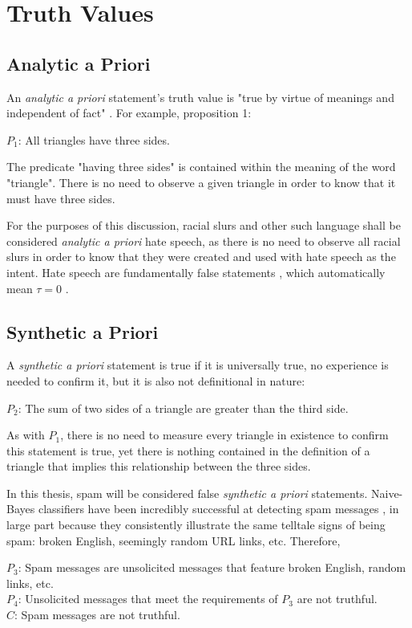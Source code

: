\documentclass[12pt]{article}
\begin{document}
\appendix
\section{Truth Values}
\label{truthvalue appendix}
\subsection{Analytic a Priori}
An \textit{analytic a priori} statement's truth value is "true by virtue of meanings and independent of fact" \cite{quine1951main}. 
For example, proposition 1: \begin{center}
    $P_1$: All triangles have three sides.
\end{center}
The predicate "having three sides" is contained within the meaning of the word "triangle". There is no need to observe a given triangle in order to know that it must have three sides.

For the purposes of this discussion, racial slurs and other such language shall be considered \textit{analytic a priori} hate speech, as there is no need to observe all racial slurs in order to know that they were created and used with hate speech as the intent. Hate speech are fundamentally false statements \cite{waldron2012harm}, which automatically mean $\tau = 0$ .

\subsection{Synthetic a Priori}
A \textit{synthetic a priori} statement is true if it is universally true, no experience is needed to confirm it, but it is also not definitional in nature:
\begin{center}
    $P_2$: The sum of two sides of a triangle are greater than the third side.
\end{center}
 
As with $P_1$, there is no need to measure every triangle in existence to confirm this statement is true, yet there is nothing contained in the definition of a triangle that implies this relationship between the three sides.

In this thesis, spam will be considered false \textit{synthetic a priori} statements. Naive-Bayes classifiers have been incredibly successful at detecting spam messages \cite{wang2010detecting,xu2019exploiting,ahmed2018detecting}, in large part because they consistently illustrate the same telltale signs of being spam: broken English, seemingly random URL links, etc. Therefore, \begin{center}
    $P_3$: Spam messages are unsolicited messages that feature broken English, random links, etc. \\
$P_4$: Unsolicited messages that meet the requirements of $P_3$ are not truthful.\\
$C$: Spam messages are not truthful.
\end{center}
 
\end{document}
